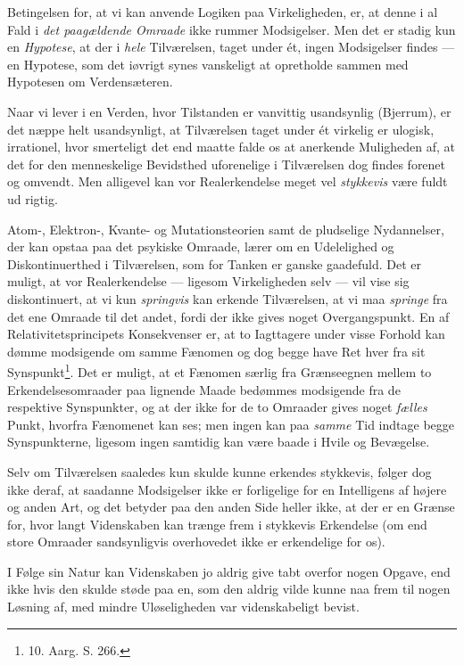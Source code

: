 \documentclass[12pt,a4paper]{article}
\newcommand{\opage}[1]{\marginnote{\footnotesize\textit{[#1]}}}
\begin{document}
Betingelsen for, at vi kan anvende Logiken paa Virkeligheden, er, at
denne i al Fald i \emph{det paagældende Omraade} ikke rummer Modsigelser.
Men det er stadig kun en \emph{Hypotese}, at der i \emph{hele}
Tilværelsen, taget under ét, ingen Modsigelser findes --- en Hypotese,
som det iøvrigt synes vanskeligt at opretholde sammen med Hypotesen om
Verdensæteren.

Naar vi lever i en Verden, hvor Tilstanden er vanvittig usandsynlig
(Bjerrum), er det næppe helt usandsynligt, at Tilværelsen taget under ét
virkelig er ulogisk, irrationel, hvor smerteligt det end maatte falde os
at anerkende Muligheden af, at det for den menneskelige Bevidsthed
uforenelige i Tilværelsen dog findes forenet og omvendt. Men alligevel
kan vor Realerkendelse meget vel \emph{stykkevis} være fuldt ud rigtig.

Atom-, Elektron-, Kvante- og Mutationsteorien samt de pludselige
Nydannelser, der kan opstaa paa det psykiske Omraade, lærer om en
Udelelighed og Diskontinuerthed i Tilværelsen, som for Tanken er ganske
gaadefuld. Det er muligt, at vor Realerkendelse --- ligesom Virkeligheden
selv --- vil vise sig \guillemotright diskontinuert\guillemotleft{}, at
vi kun \emph{springvis} kan erkende Tilværelsen, at vi maa \emph{springe}
fra det ene Omraade
\opage{15} \setcounter{footnote}{0}%
til det andet, fordi der ikke gives noget Overgangspunkt. En af
Relativitetsprincipets Konsekvenser er, at to Iagttagere under visse
Forhold kan dømme modsigende om samme Fænomen og dog begge have Ret hver
fra sit Synspunkt\footnote{10. Aarg. S. 266.}. Det er muligt, at et
Fænomen særlig fra Grænseegnen mellem to Erkendelsesomraader paa lignende
Maade bedømmes modsigende fra de respektive Synspunkter, og at der ikke
for de to Omraader gives noget \emph{fælles} Punkt, hvorfra Fænomenet kan
ses; men ingen kan paa \emph{samme} Tid indtage begge Synspunkterne,
ligesom ingen samtidig kan være baade i Hvile og Bevægelse.

Selv om Tilværelsen saaledes kun skulde kunne erkendes stykkevis, følger
dog ikke deraf, at saadanne \guillemotright
Modsigelser\guillemotleft{} ikke er forligelige for en Intelligens af
højere og anden Art, og det betyder paa den anden Side heller ikke, at
der er en Grænse for, hvor langt Videnskaben kan trænge frem i stykkevis
Erkendelse (om end store Omraader sandsynligvis overhovedet ikke er
erkendelige for os).

I Følge sin Natur kan Videnskaben jo aldrig give tabt overfor nogen
Opgave, end ikke hvis den skulde støde paa en, som den aldrig vilde kunne
naa frem til nogen Løsning af, med mindre Uløseligheden var
videnskabeligt bevist.
\end{document}

